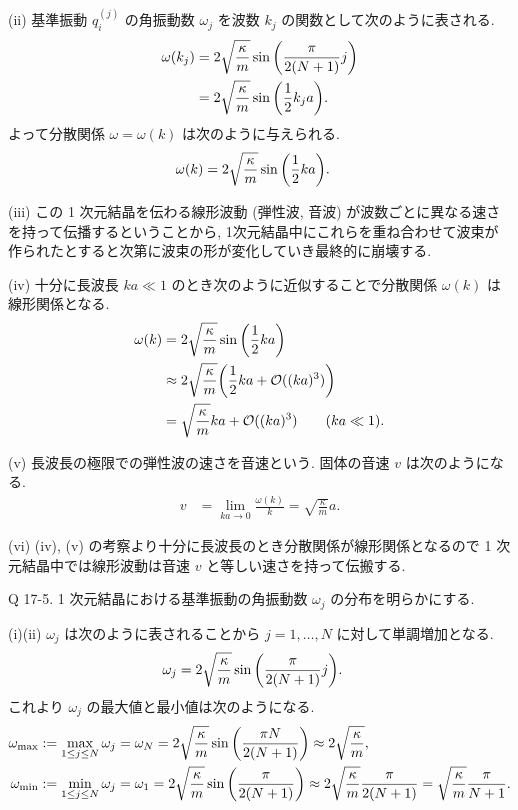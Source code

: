 \documentclass[uplatex,dvipdfmx,a4paper,11pt]{jlreq}
\theoremstyle{definition}
\begin{document}
(ii) 基準振動 $q_i^{(j)}$ の角振動数 $\omega_j$ を波数 $k_j$ の関数として次のように表される.
\begin{align}
  \omega(k_j) & = 2\sqrt{\frac{\kappa}{m}}\sin\qty(\frac{\pi}{2(N+1)}j) \\
              & = 2\sqrt{\frac{\kappa}{m}}\sin\qty(\frac{1}{2}k_ja).
\end{align}
よって分散関係 $\omega = \omega(k)$ は次のように与えられる.
\begin{align}
  \omega(k) & = 2\sqrt{\frac{\kappa}{m}}\sin\qty(\frac{1}{2}ka).
\end{align}

(iii) この 1 次元結晶を伝わる線形波動 (弾性波, 音波) が波数ごとに異なる速さを持って伝播するということから, 1次元結晶中にこれらを重ね合わせて波束が作られたとすると次第に波束の形が変化していき最終的に崩壊する.

(iv) 十分に長波長 $ka\ll 1$ のとき次のように近似することで分散関係 $\omega(k)$ は線形関係となる.
\begin{align}
  \omega(k) & = 2\sqrt{\frac{\kappa}{m}}\sin\qty(\frac{1}{2}ka)                         \\
            & \approx 2\sqrt{\frac{\kappa}{m}}\qty(\frac{1}{2}ka + \mathcal{O}((ka)^3)) \\
            & = \sqrt{\frac{\kappa}{m}}ka + \mathcal{O}((ka)^3) \qquad (ka\ll 1).
\end{align}

(v) 長波長の極限での弾性波の速さを音速という. 固体の音速 $v$ は次のようになる.
\begin{align}
  v & = \lim_{ka\to 0}\frac{\omega(k)}{k} = \sqrt{\frac{\kappa}{m}}a.
\end{align}

(vi) (iv), (v) の考察より十分に長波長のとき分散関係が線形関係となるので 1 次元結晶中では線形波動は音速 $v$ と等しい速さを持って伝搬する.

\begin{itembox}[l]{Q 17-5.}
  1 次元結晶における基準振動の角振動数 $\omega_j$ の分布を明らかにする.
\end{itembox}

(i)(ii) $\omega_j$ は次のように表されることから $j=1,\ldots,N$ に対して単調増加となる.
\begin{align}
  \omega_j & = 2\sqrt{\frac{\kappa}{m}}\sin\qty(\frac{\pi}{2(N+1)}j).
\end{align}
これより $\omega_j$ の最大値と最小値は次のようになる.
\begin{align}
  \omega_{\max} & := \max_{1\leq j\leq N}\omega_j = \omega_N = 2\sqrt{\frac{\kappa}{m}}\sin\qty(\frac{\pi N}{2(N+1)}) \approx 2\sqrt{\frac{\kappa}{m}},                                                          \\
  \omega_{\min} & := \min_{1\leq j\leq N}\omega_j = \omega_1 = 2\sqrt{\frac{\kappa}{m}}\sin\qty(\frac{\pi}{2(N+1)}) \approx 2\sqrt{\frac{\kappa}{m}}\frac{\pi}{2(N+1)} = \sqrt{\frac{\kappa}{m}}\frac{\pi}{N+1}.
\end{align}
\end{document}
